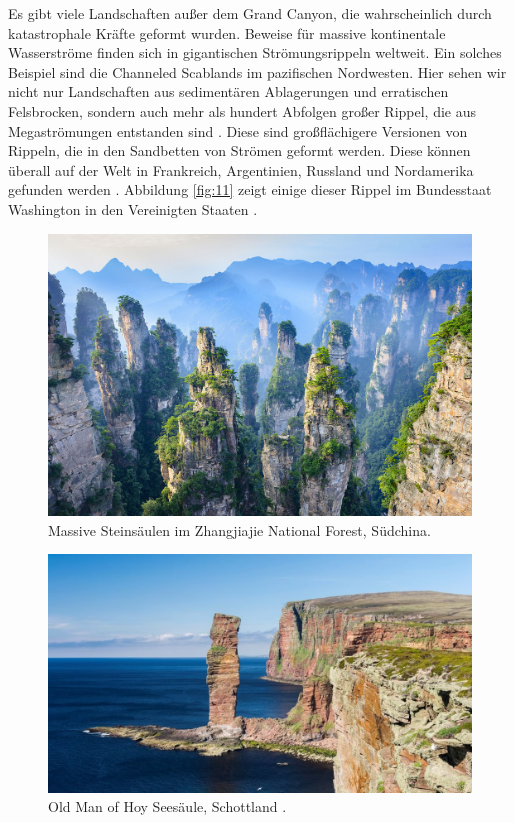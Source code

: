 \documentclass[10pt,twocolumn,letterpaper]{article}
\begin{document}
Es gibt viele Landschaften außer dem Grand Canyon, die wahrscheinlich durch katastrophale Kräfte geformt wurden. Beweise für massive kontinentale Wasserströme finden sich in gigantischen Strömungsrippeln weltweit. Ein solches Beispiel sind die Channeled Scablands im pazifischen Nordwesten. Hier sehen wir nicht nur Landschaften aus sedimentären Ablagerungen und erratischen Felsbrocken, sondern auch mehr als hundert Abfolgen großer Rippel, die aus Megaströmungen entstanden sind \cite{78,79}. Diese sind großflächigere Versionen von Rippeln, die in den Sandbetten von Strömen geformt werden. Diese können überall auf der Welt in Frankreich, Argentinien, Russland und Nordamerika gefunden werden \cite{81}. Abbildung \ref{fig:11} zeigt einige dieser Rippel im Bundesstaat Washington in den Vereinigten Staaten \cite{80}.

\begin{figure}[b]
\begin{center}
   \includegraphics[width=1\linewidth]{zhangjiajie.jpg}
\end{center}
   \caption{Massive Steinsäulen im Zhangjiajie National Forest, Südchina.}
\label{fig:12}
\label{fig:onecol}
\end{figure}

\begin{figure}[b]
\begin{center}
   \includegraphics[width=1\linewidth]{hoy.jpg}
\end{center}
   \caption{Old Man of Hoy Seesäule, Schottland \cite{83}.}
\label{fig:13}
\label{fig:onecol}
\end{figure}
\end{document}
